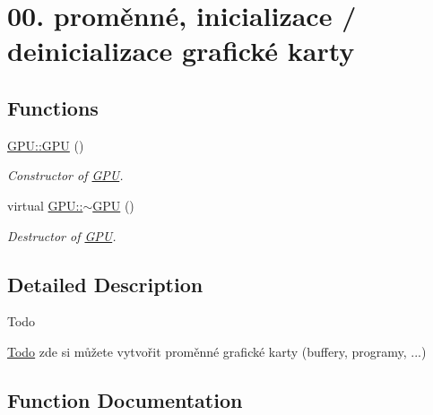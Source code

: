 \hypertarget{group__gpu__init}{}\section{00. proměnné, inicializace / deinicializace grafické karty}
\label{group__gpu__init}
\subsection*{Functions}
\begin{DoxyCompactItemize}
\item 
\hyperlink{group__gpu__init_ga2ca7973e32f63ba3472166a007419a75}{G\+P\+U\+::\+G\+PU} ()
\begin{DoxyCompactList}\small\item\em Constructor of \hyperlink{classGPU}{G\+PU}. \end{DoxyCompactList}\item 
virtual \hyperlink{group__gpu__init_gac4d153a08d3b9f40e5a8f1634f4a9e78}{G\+P\+U\+::$\sim$\+G\+PU} ()
\begin{DoxyCompactList}\small\item\em Destructor of \hyperlink{classGPU}{G\+PU}. \end{DoxyCompactList}\end{DoxyCompactItemize}


\subsection{Detailed Description}
\begin{DoxyRefDesc}{Todo}
\item[\hyperlink{todo__todo000037}{Todo}]zde si můžete vytvořit proměnné grafické karty (buffery, programy, ...) \end{DoxyRefDesc}


\subsection{Function Documentation}
\mbox{\label{group__gpu__init_ga2ca7973e32f63ba3472166a007419a75}} 
